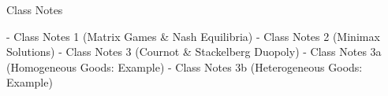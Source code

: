 

Class Notes

- Class Notes 1 (Matrix Games & Nash Equilibria)
- Class Notes 2 (Minimax Solutions)
- Class Notes 3 (Cournot & Stackelberg Duopoly)
- Class Notes 3a (Homogeneous Goods: Example)
- Class Notes 3b (Heterogeneous Goods: Example)


